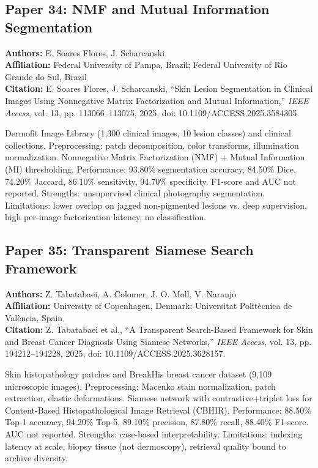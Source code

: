 \documentclass[conference]{IEEEtran}
\begin{document}
\subsection{Paper 34: NMF and Mutual Information Segmentation}

\noindent\textbf{Authors:} E. Soares Flores, J. Scharcanski\\
\textbf{Affiliation:} Federal University of Pampa, Brazil; Federal University of Rio Grande do Sul, Brazil\\
\textbf{Citation:} E. Soares Flores, J. Scharcanski, ``Skin Lesion Segmentation in Clinical Images Using Nonnegative Matrix Factorization and Mutual Information,'' \textit{IEEE Access}, vol. 13, pp. 113066--113075, 2025, doi: 10.1109/ACCESS.2025.3584305.

Dermofit Image Library (1,300 clinical images, 10 lesion classes) and clinical collections. Preprocessing: patch decomposition, color transforms, illumination normalization. Nonnegative Matrix Factorization (NMF) + Mutual Information (MI) thresholding. Performance: 93.80\% segmentation accuracy, 84.50\% Dice, 74.20\% Jaccard, 86.10\% sensitivity, 94.70\% specificity. F1-score and AUC not reported. Strengths: unsupervised clinical photography segmentation. Limitations: lower overlap on jagged non-pigmented lesions vs. deep supervision, high per-image factorization latency, no classification.

\subsection{Paper 35: Transparent Siamese Search Framework}

\noindent\textbf{Authors:} Z. Tabatabaei, A. Colomer, J. O. Moll, V. Naranjo\\
\textbf{Affiliation:} University of Copenhagen, Denmark; Universitat Politècnica de València, Spain\\
\textbf{Citation:} Z. Tabatabaei et al., ``A Transparent Search-Based Framework for Skin and Breast Cancer Diagnosis Using Siamese Networks,'' \textit{IEEE Access}, vol. 13, pp. 194212--194228, 2025, doi: 10.1109/ACCESS.2025.3628157.

Skin histopathology patches and BreakHis breast cancer dataset (9,109 microscopic images). Preprocessing: Macenko stain normalization, patch extraction, elastic deformations. Siamese network with contrastive+triplet loss for Content-Based Histopathological Image Retrieval (CBHIR). Performance: 88.50\% Top-1 accuracy, 94.20\% Top-5, 89.10\% precision, 87.80\% recall, 88.40\% F1-score. AUC not reported. Strengths: case-based interpretability. Limitations: indexing latency at scale, biopsy tissue (not dermoscopy), retrieval quality bound to archive diversity.
\end{document}
